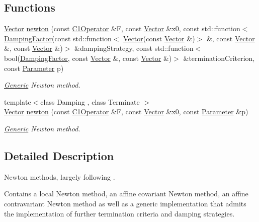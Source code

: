 \subsection*{Functions}
\begin{DoxyCompactItemize}
\item 
\hyperlink{classSpacy_1_1Vector}{Vector} \hyperlink{namespaceSpacy_1_1Newton_a90e8526badc5b9db03b5ff6e655ad568}{newton} (const \hyperlink{classSpacy_1_1C1Operator}{C1\+Operator} \&F, const \hyperlink{classSpacy_1_1Vector}{Vector} \&x0, const std\+::function$<$ \hyperlink{classSpacy_1_1DampingFactor}{Damping\+Factor}(const std\+::function$<$ \hyperlink{classSpacy_1_1Vector}{Vector}(const \hyperlink{classSpacy_1_1Vector}{Vector} \&)$>$ \&, const \hyperlink{classSpacy_1_1Vector}{Vector} \&, const \hyperlink{classSpacy_1_1Vector}{Vector} \&)$>$ \&damping\+Strategy, const std\+::function$<$ bool(\hyperlink{classSpacy_1_1DampingFactor}{Damping\+Factor}, const \hyperlink{classSpacy_1_1Vector}{Vector} \&, const \hyperlink{classSpacy_1_1Vector}{Vector} \&)$>$ \&termination\+Criterion, const \hyperlink{structSpacy_1_1Newton_1_1Parameter}{Parameter} p)
\begin{DoxyCompactList}\small\item\em \hyperlink{namespaceSpacy_1_1Generic}{Generic} Newton method. \end{DoxyCompactList}\item 
{\footnotesize template$<$class Damping , class Terminate $>$ }\\\hyperlink{classSpacy_1_1Vector}{Vector} \hyperlink{namespaceSpacy_1_1Newton_a39c7915072931fafca5d3012aa6349bf}{newton} (const \hyperlink{classSpacy_1_1C1Operator}{C1\+Operator} \&F, const \hyperlink{classSpacy_1_1Vector}{Vector} \&x0, const \hyperlink{structSpacy_1_1Newton_1_1Parameter}{Parameter} \&p)
\begin{DoxyCompactList}\small\item\em \hyperlink{namespaceSpacy_1_1Generic}{Generic} Newton method. \end{DoxyCompactList}\end{DoxyCompactItemize}


\subsection{Detailed Description}
Newton methods, largely following \cite{Deuflhard2004}. 

Contains a local Newton method, an affine covariant Newton method, an affine contravariant Newton method as well as a generic implementation that admits the implementation of further termination criteria and damping strategies. 

